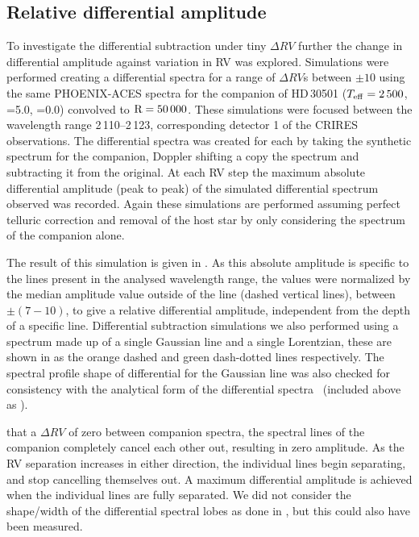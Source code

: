 \subsection{Relative differential amplitude}
To investigate the differential subtraction under tiny \(\Delta RV\) further the change in differential amplitude against variation in {RV} was explored.
Simulations were performed creating a differential spectra for a range of \(\Delta {RV}\)s between \(\pm10\)\kmps{} using the same {PHOENIX-ACES} spectra for the companion of {HD\,30501} (\(T_{\mathrm{eff}}{}=2\,500\)\K{}, \logg{}=5.0, \feh{}=0.0) convolved to \(\textrm{R}=50\,000\). These simulations were focused between the wavelength range 2\,110--2\,123\nm{}, corresponding detector 1 of the {CRIRES} observations. The differential spectra was created for each by taking the synthetic spectrum for the companion, Doppler shifting a copy the spectrum and subtracting it from the original. At each {RV} step the maximum absolute differential amplitude (peak to peak) of the simulated differential spectrum observed was recorded. Again these simulations are performed assuming perfect telluric correction and removal of the host star by only considering the spectrum of the companion alone.

The result of this simulation is given in . As this absolute amplitude is specific to the lines present in the analysed wavelength range, the values were normalized by the median amplitude value outside of the line {\fwhm} (dashed vertical lines), between \(\pm(7-10)\)\kmps{}, to give a relative differential amplitude, independent from the depth of a specific line. Differential subtraction simulations we also performed using a spectrum made up of a single Gaussian line and a single Lorentzian, these are shown in  as the orange dashed and green dash-dotted lines respectively. The spectral profile shape of differential for the Gaussian line was also checked for consistency with the analytical form of the differential spectra~\citet[][Equation~A.1]{ferluga_separating_1997} (included above as ).

 that a \(\Delta {RV}\) of zero between companion spectra, the spectral lines of the companion completely cancel each other out, resulting in zero amplitude. As the {RV} separation increases in either direction, the individual lines begin separating, and stop cancelling themselves out. A maximum differential amplitude is achieved when the individual lines are fully separated. We did not consider the shape/width of the differential spectral lobes as done in \citet[][eqn.~A.1]{ferluga_separating_1997}, but this could also have been measured.

